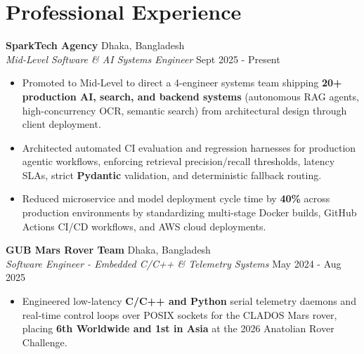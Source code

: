 \documentclass[9.5pt,a4paper]{article}
\begin{document}
\section*{Professional Experience}
\noindent
\textbf{SparkTech Agency} \hfill Dhaka, Bangladesh\\
\textit{Mid-Level Software & AI Systems Engineer} \hfill Sept 2025 - Present
\begin{itemize}
    \item Promoted to Mid-Level to direct a 4-engineer systems team shipping \textbf{20+ production AI, search, and backend systems} (autonomous RAG agents, high-concurrency OCR, semantic search) from architectural design through client deployment.
    \item Architected automated CI evaluation and regression harnesses for production agentic workflows, enforcing retrieval precision/recall thresholds, latency SLAs, strict \textbf{Pydantic} validation, and deterministic fallback routing.
    \item Reduced microservice and model deployment cycle time by \textbf{40\%} across production environments by standardizing multi-stage Docker builds, GitHub Actions CI/CD workflows, and AWS cloud deployments.
\end{itemize}
\vspace{0.6pt}
\noindent
\textbf{GUB Mars Rover Team} \hfill Dhaka, Bangladesh\\
\textit{Software Engineer - Embedded C/C++ & Telemetry Systems} \hfill May 2024 - Aug 2025
\begin{itemize}
    \item Engineered low-latency \textbf{C/C++ and Python} serial telemetry daemons and real-time control loops over POSIX sockets for the CLADOS Mars rover, placing \textbf{6th Worldwide and 1st in Asia} at the 2026 Anatolian Rover Challenge.
\end{itemize}
\vspace{0.6pt}
\end{document}
